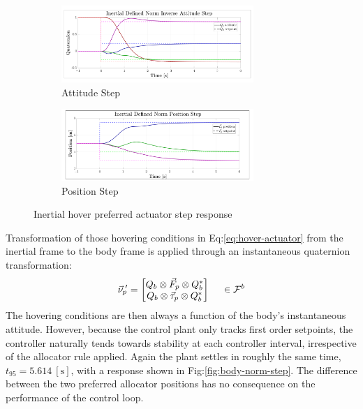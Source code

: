 \begin{figure}[hbtp]
\vspace{-11pt}
\centering
\begin{subfigure}{\textwidth}
\centering
\includegraphics[width=0.8\textwidth]{graphs/inertial_norm_attitude}
\vspace{-12pt}
\caption{Attitude Step}
\label{fig:inertial_norm_attitude}
\end{subfigure}
\begin{subfigure}{\textwidth}
\vspace{-2pt}
\centering
\includegraphics[width=0.8\textwidth]{graphs/inertial_norm_position}
\vspace{-6pt}
\caption{Position Step}
\label{fig:inertia_norm_position}
\vspace{-8pt}
\end{subfigure}
\caption{Inertial hover preferred actuator step response}
\label{fig:inertial-norm-step}
\vspace{-18pt}
\end{figure}
\par
Transformation of those hovering conditions in Eq:\ref{eq:hover-actuator} from the inertial frame to the body frame is applied through an instantaneous quaternion transformation:
\begin{equation}
\vec{\nu}_p\text{}\hspace{-2pt}'=\begin{bmatrix}
Q_b\otimes\vec{F}_p\otimes Q_b^*\\
Q_b\otimes\vec{\tau}_p\otimes Q_b^*
\end{bmatrix}~~~~\in\mathcal{F}^{b}
\end{equation}
The hovering conditions are then always a function of the body's instantaneous attitude. However, because the control plant only tracks first order setpoints, the controller naturally tends towards stability at each controller interval, irrespective of the allocator rule applied. Again the plant settles in roughly the same time, $t_{95}=5.614~[\text{s}]$, with a response shown in Fig:\ref{fig:body-norm-step}. The difference between the two preferred allocator positions has no consequence on the performance of the control loop.
